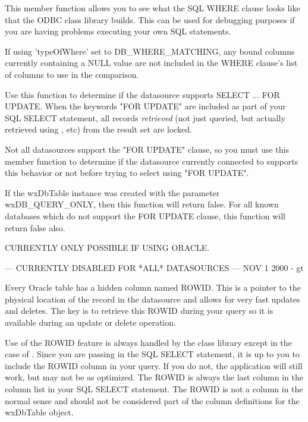 
This member function allows you to see what the SQL WHERE clause looks like
that the ODBC class library builds.  This can be used for debugging purposes
if you are having problems executing your own SQL statements.

If using 'typeOfWhere' set to DB\_WHERE\_MATCHING, any bound columns currently
containing a NULL value are not included in the WHERE clause's list of
columns to use in the comparison.

\label{wxdbtablecanselectforupdate}


Use this function to determine if the datasource supports SELECT ... FOR UPDATE.
When the keywords "FOR UPDATE" are included as part of your SQL SELECT statement,
all records {\it retrieved} (not just queried, but actually retrieved using
, etc) from the result set are
locked.


Not all datasources support the "FOR UPDATE" clause, so you must use this
member function to determine if the datasource currently connected to supports
this behavior or not before trying to select using "FOR UPDATE".

If the wxDbTable instance was created with the parameter wxDB\_QUERY\_ONLY, then
this function will return false.  For all known databases which do not support
the FOR UPDATE clause, this function will return false also.

\label{wxdbtablecanupdatebyrowid}


CURRENTLY ONLY POSSIBLE IF USING ORACLE.

--- CURRENTLY DISABLED FOR *ALL* DATASOURCES --- NOV 1 2000 - gt

Every Oracle table has a hidden column named ROWID.  This is a pointer to the
physical location of the record in the datasource and allows for very fast
updates and deletes.  The key is to retrieve this ROWID during your query so
it is available during an update or delete operation.

Use of the ROWID feature is always handled by the class library except in the
case of .  Since
you are passing in the SQL SELECT statement,
it is up to you to include the ROWID column in your query.  If you do not,
the application will still work, but may not be as optimized.  The ROWID is
always the last column in the column list in your SQL SELECT statement.
The ROWID is not a column in the normal sense and should not be considered
part of the column definitions for the wxDbTable object.

